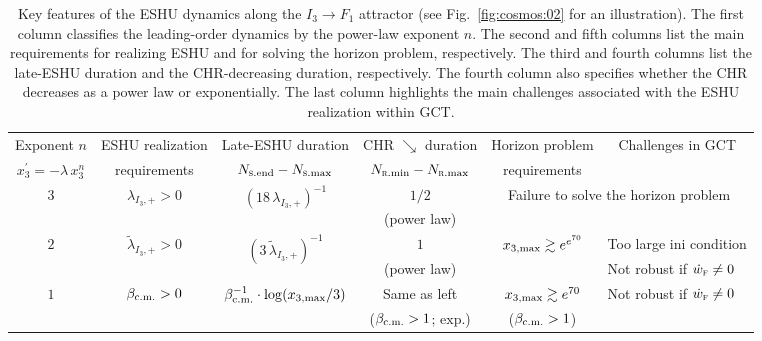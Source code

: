 \documentclass[aps,prd,twocolumn]{revtex4-2}
\newcommand\subcm{{\rm c.m.}}
\newcommand\subF{\textsc{f}}
\newcommand\subRmax{{\rm \textsc{r}.max}}
\newcommand\subRmin{{\rm \textsc{r}.min}}
\newcommand\subSmax{{\rm \textsc{s}.max}}
\newcommand\subSend{{\rm \textsc{s}.end}}
\newcommand\submax{{\rm max}}
\begin{document}
\begin{table}[!t]
  \caption{Key features of the ESHU dynamics along the $I_3\rightarrow F_1$ attractor (see Fig.~\ref{fig:cosmos:02} for an illustration). The first column classifies the leading-order dynamics by the power-law exponent $n$. The second and fifth columns list the main requirements for realizing ESHU and for solving the horizon problem, respectively. The third and fourth columns list the late-ESHU duration and the CHR-decreasing duration, respectively. The fourth column also specifies whether the CHR decreases as a power law or exponentially. The last column highlights the main challenges associated with the ESHU realization within GCT.}
  \label{tab:04}
  \begin{tabular*}{\hsize}{@{\ \ }@{\extracolsep{\fill}}cccccl@{\ \ }}
    \hline\hline
    Exponent $n$  &  ESHU realization  &  Late-ESHU duration  &  CHR {\fontsize{8pt}{0pt}\selectfont$\searrow$} duration  &  Horizon problem  &  \multicolumn{1}{c}{\multirow{2}{*}{Challenges in GCT}}  \\[-0.3mm]
    $x_3^\prime=-\lambda\,x_3^n$  &  requirements  &  $N_\subSend-N_\subSmax$  &  $N_\subRmin-N_\subRmax$  &  requirements  \\[0.2mm]
    \hline
    \multirow{2}{*}{$3$}  &  \multirow{2}{*}{$\lambda_{I_3,+}>0$}  &  \multirow{2}{*}{$(18\,\lambda_{I_3,+})^{-1}$}  &  $1/2$  &  \multicolumn{2}{c}{\multirow{2}{*}{Failure to solve the horizon problem}}  \\[-0.2mm]
      &  &  &  (power law)  &  \\[0.2mm]
    \hline
    \multirow{2}{*}{$2$}  &  \multirow{2}{*}{$\tilde{\lambda}_{I_3,+}>0$}  &  \multirow{2}{*}{$(3\,\tilde{\lambda}_{I_3,+})^{-1}$}  &  $1$  &  \multirow{2}{*}{$x_{3,\submax}\gtrsim e^{e^{70}}$}  &  Too large ini condition  \\[-0.2mm]
      &  &  &  (power law)  &   &  Not robust if $\dot{w}_\subF\neq0$  \\[0.2mm]
    \hline
    \multirow{2}{*}{$1$}  &  \multirow{2}{*}{$\beta_\subcm>0$}  &  \multirow{2}{*}{$\displaystyle\beta_\subcm^{-1}\cdot\log(x_{3,\submax}/3)$}  &  Same as left  &  $x_{3,\submax}\gtrsim e^{70}$  &  \multirow{2}{*}{Not robust if $\dot{w}_\subF\neq0$}  \\[-0.2mm]
      &  &  &  ($\beta_\subcm>1$; $\mathrm{exp.}$)  &  ($\beta_\subcm>1$)  &  \\[0.2mm]
    \hline\hline
  \end{tabular*}
\end{table}
\end{document}
